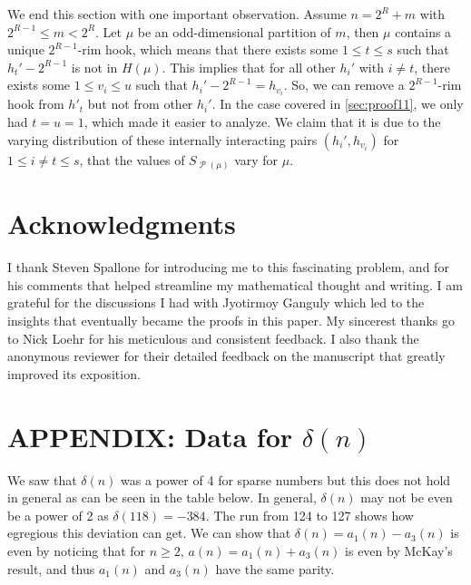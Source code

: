 \documentclass[12pt]{amsart}
\theoremstyle{definition}
\numberwithin{equation}{section}
\DeclareMathOperator{\p}{\mathcal{P}}
\begin{document}
We end this section with one important observation. Assume $n = 2^{R} + m$ with $2^{R-1}\leq m < 2^R$. Let $\mu$ be an odd-dimensional partition of $m$, then $\mu$ contains a unique $2^{R-1}$-rim hook, which means that there exists some $1\leq t \leq s$ such that $h_t' - 2^{R-1}$ is not in $H(\mu)$. This implies that for all other $h_i'$ with $i\neq t$, there exists some $1\leq v_i \leq u$ such that $h_i' - 2^{R-1} = h_{v_i}$. So, we can remove a $2^{R-1}$-rim hook from $h'_t$ but not from other $h_i'$. In the case covered in \cref{sec:proof11}, we only had $t =u= 1$, which made it easier to analyze. We claim that it is due to the varying distribution of these internally interacting pairs $(h_i', h_{v_i})$ for $1\leq i \neq t\leq s$, that the values of $S_{\p(\mu)}$ vary for $\mu$.

\section{Acknowledgments}
I thank Steven Spallone for introducing me to this fascinating problem, and for his comments that helped streamline my mathematical thought and writing. I am grateful for the discussions I had with Jyotirmoy Ganguly which led to the insights that eventually became the proofs in this paper. My sincerest thanks go to Nick Loehr for his meticulous and consistent feedback. I also thank the anonymous reviewer for their detailed feedback on the manuscript that greatly improved its exposition.
\section{APPENDIX: Data for $\delta(n)$}\label{sec:problems}
We saw that $\delta(n)$ was a power of 4 for sparse numbers but this does not hold in general as can be seen in the table below. %
In general, $\delta(n)$ may not be even be a power of 2 as $\delta(118) = -384$. The run from 124 to 127 shows how egregious this deviation can get. We can show that $\delta(n) = a_1(n) - a_3(n)$ is even by noticing that for $n\geq 2$, $a(n) = a_1(n) + a_3(n)$ is even by McKay's result, and thus $a_1(n)$ and $a_3(n)$ have the same parity.
\end{document}
